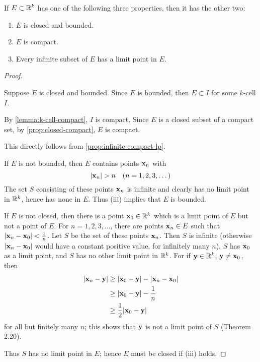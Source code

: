 \begin{proposition}\label{prop:closed-bounded-compact-inf-lp}
If $E\subset\mathbb R^k$ has one of the following three properties, then it has the other two:
\begin{enumerate}[label=(\roman*)]
\item $E$ is closed and bounded.
\item $E$ is compact.
\item Every infinite subset of $E$ has a limit point in $E$.
\end{enumerate}
\end{proposition}

\begin{proof} \

 Suppose $E$ is closed and bounded. Since $E$ is bounded, then $E\subset I$ for some $k$-cell $I$.

By \ref{lemma:k-cell-compact}, $I$ is compact. Since $E$ is a closed subset of a compact set, by \ref{prop:closed-compact}, $E$ is compact.

 This directly follows from \ref{prop:infinite-compact-lp}.

 If $E$ is not bounded, then $E$ contains points $\vb{x}_n$ with
\[|\vb{x}_n|>n\quad(n=1,2,3,\dots)\]
The set $S$ consisting of these points $\vb{x}_n$ is infinite and clearly has no limit point in $\mathbb R^k$, hence has none in $E$. Thus (iii) implies that $E$ is bounded.

If $E$ is not closed, then there is a point $\vb{x}_0\in\mathbb R^k$ which is a limit point of $E$ but not a point of $E$. For $n=1,2,3,\dots$, there are points $\vb{x}_n\in E$ such that $|\vb{x}_n-\vb{x}_0|<\frac{1}{n}$. Let $S$ be the set of these points $\vb{x}_n$. Then $S$ is infinite (otherwise $|\vb{x}_n-\vb{x}_0|$ would have a constant positive value, for infinitely many $n$), $S$ has $\vb{x}_0$ as a limit point, and $S$ has no other limit point in $\mathbb R^k$. For if $\vb{y}\in\mathbb R^k$, $\vb{y}\neq\vb{x}_0$, then
\begin{align*}
|\vb{x}_n-\vb{y}|&\ge|\vb{x}_0-\vb{y}|-|\vb{x}_n-\vb{x}_0|\\
&\ge|\vb{x}_0-\vb{y}|-\frac{1}{n}\\
&\ge\frac{1}{2}|\vb{x}_0-\vb{y}|
\end{align*}
for all but finitely many $n$; this shows that $\vb{y}$ is not a limit point of $S$ (Theorem 2.20).

Thus $S$ has no limit point in $E$; hence $E$ must be closed if (iii) holds.
\end{proof}

